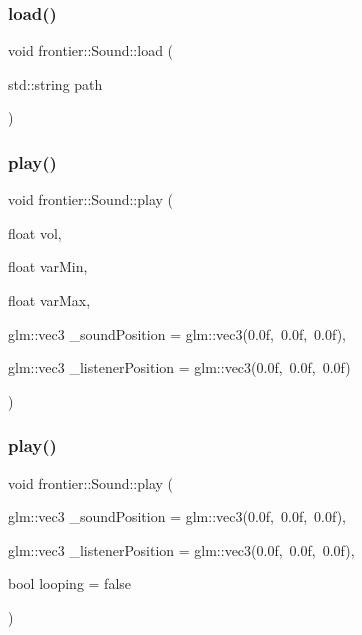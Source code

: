 \subsubsection{\texorpdfstring{load()}{load()}}
{\footnotesize\ttfamily void frontier\+::\+Sound\+::load (\begin{DoxyParamCaption}\item[{std\+::string}]{path }\end{DoxyParamCaption})}

\mbox{\label{classfrontier_1_1_sound_af16c7e18be028f8ecde1423d19b7216d}} 
\subsubsection{\texorpdfstring{play()}{play()}\hspace{0.1cm}{\footnotesize\ttfamily [1/2]}}
{\footnotesize\ttfamily void frontier\+::\+Sound\+::play (\begin{DoxyParamCaption}\item[{float}]{vol,  }\item[{float}]{var\+Min,  }\item[{float}]{var\+Max,  }\item[{glm\+::vec3}]{\+\_\+sound\+Position = {\ttfamily glm\+:\+:vec3(0.0f,~0.0f,~0.0f)},  }\item[{glm\+::vec3}]{\+\_\+listener\+Position = {\ttfamily glm\+:\+:vec3(0.0f,~0.0f,~0.0f)} }\end{DoxyParamCaption})}

\mbox{\label{classfrontier_1_1_sound_ad46b70e56c1425a08e0658032c841dbd}} 
\subsubsection{\texorpdfstring{play()}{play()}\hspace{0.1cm}{\footnotesize\ttfamily [2/2]}}
{\footnotesize\ttfamily void frontier\+::\+Sound\+::play (\begin{DoxyParamCaption}\item[{glm\+::vec3}]{\+\_\+sound\+Position = {\ttfamily glm\+:\+:vec3(0.0f,~0.0f,~0.0f)},  }\item[{glm\+::vec3}]{\+\_\+listener\+Position = {\ttfamily glm\+:\+:vec3(0.0f,~0.0f,~0.0f)},  }\item[{bool}]{looping = {\ttfamily false} }\end{DoxyParamCaption})}

